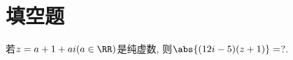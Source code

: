 \documentclass[8pt]{article}
\author{\Author}
\title{\Title}
\date{}
\begin{document}
	\maketitle


	\tableofcontents

	\section{填空题}
	
		\begin{easonproblem}
			若\(z = a + 1 + ai (a \in \RR)\)是纯虚数, 则\(\abs{(12i-5)(z+1)}=\)?.
			\subproblem
		\end{easonproblem}
\end{document}
